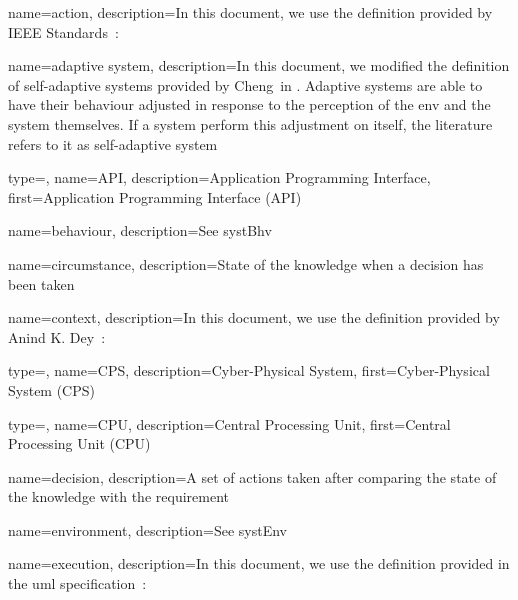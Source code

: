 {
	name={action},
	description={In this document, we use the definition provided by IEEE Standards~\cite{iso2017systems}: }
}

{
	name={adaptive system},
	description={In this document, we modified the definition of self-adaptive systems provided by Cheng~\etal in \cite{DBLP:conf/dagstuhl/ChengLGIMABBBCSDFGGGKKKLMMMPSTTWW09}. Adaptive systems are able to have their \gls{behaviour} adjusted in response to the perception of the \gls{env} and the system themselves. If a system perform this adjustment on itself, the literature refers to it as self-adaptive system}
}

{
	type=\acronymtype,
	name={API},
	description={Application Programming Interface},
	first={Application Programming Interface (API)}
}

{
	name={behaviour},
	description={See \gls{systBhv}}
}

{
	name={circumstance},
	description={State of the \gls{knowledge} when a \gls{decision} has been taken}
}

{
	name={context},
	description={In this document, we use the definition provided by Anind K. Dey~\cite{DBLP:journals/puc/Dey01}: }
}

{
	type=\acronymtype,
	name={CPS},
	description={Cyber-Physical System},
	first={Cyber-Physical System (CPS)}
}

{
	type=\acronymtype,
	name={CPU},
	description={Central Processing Unit},
	first={Central Processing Unit (CPU)}
}

{
	name={decision},
	description={A set of \glspl{action} taken after comparing the state of the \gls{knowledge} with the \gls{requirement}}
}

{
	name={environment},
	description={See \gls{systEnv}}
}

{
	name={execution},
	description={In this document, we use the definition provided in the \gls{uml} specification~\cite{omg2017umlspec}: }
}

